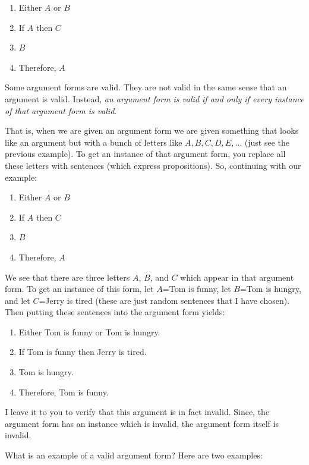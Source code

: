 \documentclass[
]{book}
\providecommand{\tightlist}{%
  \setlength{\itemsep}{0pt}\setlength{\parskip}{0pt}}
\begin{document}
\begin{enumerate}
\def\labelenumi{\arabic{enumi}.}
\tightlist
\item
  Either \(A\) or \(B\)
\item
  If \(A\) then \(C\)
\item
  \(B\)
\item
  Therefore, \(A\)
\end{enumerate}

Some argument forms are valid. They are not valid in the same sense that an argument is valid. Instead, \emph{an argument form is valid if and only if every instance of that argument form is valid}.

That is, when we are given an argument form we are given something that looks like an argument but with a bunch of letters like \(A,B,C,D,E,\ldots\) (just see the previous example). To get an instance of that argument form, you replace all these letters with sentences (which express propositions). So, continuing with our example:

\begin{enumerate}
\def\labelenumi{\arabic{enumi}.}
\tightlist
\item
  Either \(A\) or \(B\)
\item
  If \(A\) then \(C\)
\item
  \(B\)
\item
  Therefore, \(A\)
\end{enumerate}

We see that there are three letters \(A\), \(B\), and \(C\) which appear in that argument form. To get an instance of this form, let \(A\)=Tom is funny, let \(B\)=Tom is hungry, and let \(C\)=Jerry is tired (these are just random sentences that I have chosen). Then putting these sentences into the argument form yields:

\begin{enumerate}
\def\labelenumi{\arabic{enumi}.}
\tightlist
\item
  Either Tom is funny or Tom is hungry.
\item
  If Tom is funny then Jerry is tired.
\item
  Tom is hungry.
\item
  Therefore, Tom is funny.
\end{enumerate}

I leave it to you to verify that this argument is in fact invalid. Since, the argument form has an instance which is invalid, the argument form itself is invalid.

What is an example of a valid argument form? Here are two examples:
\end{document}
